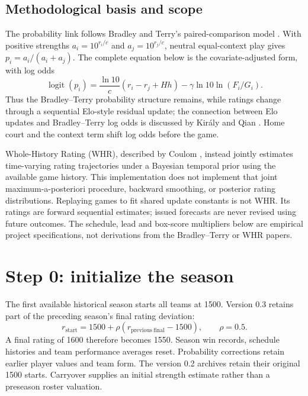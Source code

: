 \documentclass[11pt]{article}
\begin{document}
\subsection{Methodological basis and scope}
The probability link follows Bradley and Terry's paired-comparison model
\cite{bradleyterry}. With positive strengths $a_i=10^{r_i/c}$ and
$a_j=10^{r_j/c}$, neutral equal-context play gives
$p_i=a_i/(a_i+a_j)$. The complete equation below is the covariate-adjusted
form, with log odds
\begin{equation}
 \operatorname{logit}(p_i)=\frac{\ln 10}{c}(r_i-r_j+Hh)
 -\gamma\ln 10\ln(F_i/G_i).
\end{equation}
Thus the Bradley--Terry probability structure remains, while ratings change
through a sequential Elo-style residual update; the connection between
Elo updates and Bradley--Terry log odds is discussed by Kir\'aly and Qian
\cite{onlineelo}. Home court and the context
term shift log odds before the game.

Whole-History Rating (WHR), described by Coulom \cite{whr}, instead jointly
estimates time-varying rating trajectories under a Bayesian temporal prior
using the available game history. This implementation does not implement
that joint maximum-a-posteriori procedure, backward smoothing, or posterior
rating distributions. Replaying games to fit shared update constants is not
WHR. Its ratings are forward sequential estimates; issued forecasts are
never revised using future outcomes. The schedule, lead and box-score
multipliers below are empirical project specifications, not derivations
from the Bradley--Terry or WHR papers.

\section{Step 0: initialize the season}
The first available historical season starts all teams at 1500. Version 0.3
retains part of the preceding season's final rating deviation:
\begin{equation}\label{eq:carryover}
 r_{\mathrm{start}}=1500+\rho(r_{\mathrm{previous\ final}}-1500),\qquad \rho=0.5.
\end{equation}
A final rating of 1600 therefore becomes 1550. Season win records,
schedule histories and team performance averages reset. Probability
corrections retain earlier player values and team form. The version 0.2
archives retain their original 1500 starts. Carryover supplies an initial
strength estimate rather than a preseason roster valuation.
\end{document}
